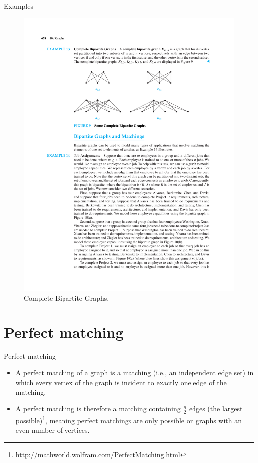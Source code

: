 \documentclass{beamer}
\theoremstyle{definition}
\begin{document}
\begin{frame}{Examples}
    \begin{figure}
        \includegraphics[trim={4.5cm 17.5cm 4.5cm 5cm}, clip, width=1\linewidth]{p658}
        \caption{Complete Bipartite Graphs.}
    \end{figure}
\end{frame}

\section{Perfect matching}

\begin{frame}{Perfect matching}
    \begin{itemize}
        \item A perfect matching of a graph is a matching (i.e., an independent edge set) in which every vertex of the graph is incident to exactly one edge of the matching.
        \item A perfect matching is therefore a matching containing $\frac{n}{2}$ edges (the largest possible)\footnote{{\tiny \url{http://mathworld.wolfram.com/PerfectMatching.html}}}, meaning perfect matchings are only possible on graphs with an even number of vertices.
    \end{itemize}
\end{frame}
\end{document}
